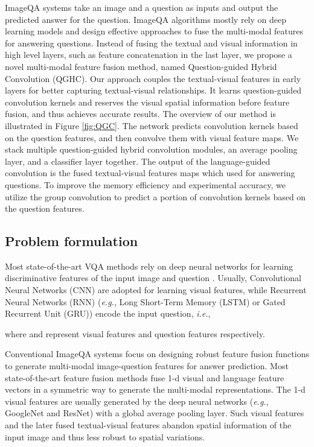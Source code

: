 \documentclass[runningheads]{llncs}
\begin{document}
ImageQA systems take an image and a question as inputs and output the predicted answer for the question. ImageQA algorithms mostly rely on deep learning models and design effective approaches to fuse the multi-modal features for answering questions. Instead of fusing the textual and visual information in high level layers, such as feature concatenation in the last layer, we propose a novel multi-modal feature fusion method, named Question-guided Hybrid Convolution (QGHC). Our approach couples the textual-visual features in early layers for better capturing textual-visual relationships. It learns question-guided convolution kernels and reserves the visual spatial information before feature fusion, and thus achieves accurate results.
The overview of our method is illustrated in Figure \ref{fig:QGC}. The network predicts convolution kernels based on the question features, and then convolve them with visual feature maps. We stack multiple question-guided hybrid convolution modules, an average pooling layer, and a classifier layer together. The output of the language-guided convolution is the fused textual-visual features maps which used for answering questions. To improve the memory efficiency and experimental accuracy, we utilize the group convolution to predict a portion of convolution kernels based on the question features.

\subsection{Problem formulation}
\label{sec:problem}

Most state-of-the-art VQA methods rely on deep neural networks for learning discriminative features of the input image  and question . Usually, Convolutional Neural Networks (CNN) are adopted for learning visual features, while Recurrent Neural Networks (RNN) (\textit{e.g.}, Long Short-Term Memory (LSTM) or Gated Recurrent Unit (GRU)) encode the input question, \textit{i.e.},

where  and  represent visual features and question features respectively.


Conventional ImageQA systems focus on designing robust feature fusion functions to generate multi-modal image-question features for answer prediction.
Most state-of-the-art feature fusion methods fuse 1-d visual and language feature vectors in a symmetric way to generate the multi-modal representations. The 1-d visual features are usually generated by the deep neural networks (\textit{e.g.}, GoogleNet and ResNet) with a global average pooling layer. Such visual features  and the later fused textual-visual features abandon spatial information of the input image and thus less robust to spatial variations. 
\end{document}
